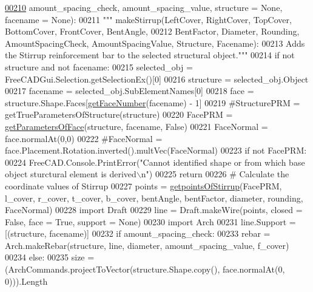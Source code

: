 \begin{DoxyCode}
\hypertarget{namespaceStirrup.tex_l00210}{}\hyperlink{namespaceStirrup_a705fc121e2af9c8ac05eb299f4fb9f2f}{00210}         amount\_spacing\_check, amount\_spacing\_value, structure = \textcolor{keywordtype}{None}, facename = \textcolor{keywordtype}{None}):
00211     \textcolor{stringliteral}{""" makeStirrup(LeftCover, RightCover, TopCover, BottomCover, FrontCover, BentAngle,}
00212 \textcolor{stringliteral}{    BentFactor, Diameter, Rounding, AmountSpacingCheck, AmountSpacingValue, Structure, Facename):}
00213 \textcolor{stringliteral}{    Adds the Stirrup reinforcement bar to the selected structural object."""}
00214     \textcolor{keywordflow}{if} \textcolor{keywordflow}{not} structure \textcolor{keywordflow}{and} \textcolor{keywordflow}{not} facename:
00215         selected\_obj = FreeCADGui.Selection.getSelectionEx()[0]
00216         structure = selected\_obj.Object
00217         facename = selected\_obj.SubElementNames[0]
00218     face = structure.Shape.Faces[\hyperlink{namespaceRebarfunc_a3885b3b63e3a41508ac79bc7550cf301}{getFaceNumber}(facename) - 1]
00219     \textcolor{comment}{#StructurePRM = getTrueParametersOfStructure(structure)}
00220     FacePRM = \hyperlink{namespaceRebarfunc_a92122b3d7cedd3d47bb63380a5ac4d08}{getParametersOfFace}(structure, facename, \textcolor{keyword}{False})
00221     FaceNormal = face.normalAt(0,0)
00222     \textcolor{comment}{#FaceNormal = face.Placement.Rotation.inverted().multVec(FaceNormal)}
00223     \textcolor{keywordflow}{if} \textcolor{keywordflow}{not} FacePRM:
00224         FreeCAD.Console.PrintError(\textcolor{stringliteral}{"Cannot identified shape or from which base object sturctural element is
       derived\(\backslash\)n"})
00225         \textcolor{keywordflow}{return}
00226     \textcolor{comment}{# Calculate the coordinate values of Stirrup}
00227     points = \hyperlink{namespaceStirrup_aa6df5118806bfe9d3a799e1bf549bb0a}{getpointsOfStirrup}(FacePRM, l\_cover, r\_cover, t\_cover, b\_cover, bentAngle, 
      bentFactor, diameter, rounding, FaceNormal)
00228     \textcolor{keyword}{import} Draft
00229     line = Draft.makeWire(points, closed = \textcolor{keyword}{False}, face = \textcolor{keyword}{True}, support = \textcolor{keywordtype}{None})
00230     \textcolor{keyword}{import} Arch
00231     line.Support = [(structure, facename)]
00232     \textcolor{keywordflow}{if} amount\_spacing\_check:
00233         rebar = Arch.makeRebar(structure, line, diameter, amount\_spacing\_value, f\_cover)
00234     \textcolor{keywordflow}{else}:
00235         size = (ArchCommands.projectToVector(structure.Shape.copy(), face.normalAt(0, 0))).Length

\end{DoxyCode}
